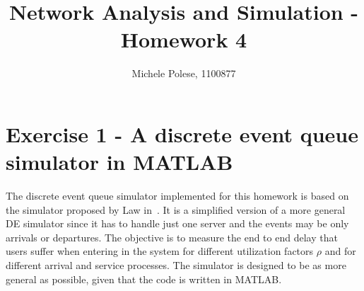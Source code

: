 \documentclass[10pt]{article}
\begin{document}
\title{Network Analysis and Simulation - Homework 4}
\author{Michele Polese, 1100877}

\maketitle

\section*{Exercise 1 - A discrete event queue simulator in MATLAB}
The discrete event queue simulator implemented for this homework is based on the simulator proposed by Law in~\cite{law}. It is a simplified version of a more general DE simulator since it has to handle just one server and the events may be only arrivals or departures. The objective is to measure the end to end delay that users suffer when entering in the system for different utilization factors $\rho$ and for different arrival and service processes. The simulator is designed to be as more general as possible, given that the code is written in MATLAB. 
\end{document}
